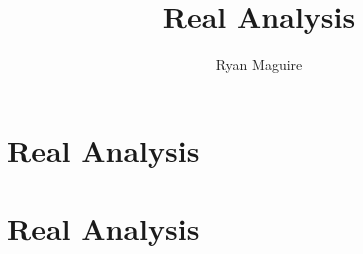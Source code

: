 \documentclass[crop=false,class=book,oneside]{standalone}
\begin{document}
    \ifx\ifmathcourses\undefined
        \title{Real Analysis}
        \author{Ryan Maguire}
        \date{\vspace{-5ex}}
        \maketitle
        \tableofcontents
        \clearpage
        \chapter*{Real Analysis}
        \setcounter{chapter}{1}
    \else
        \chapter{Real Analysis}
    \fi
\end{document}
